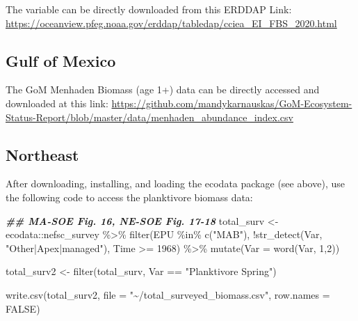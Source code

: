 \documentclass[
]{book}
\newenvironment{Shaded}{\begin{snugshade}}{\end{snugshade}}
\newcommand{\AttributeTok}[1]{\textcolor[rgb]{0.77,0.63,0.00}{#1}}
\newcommand{\ConstantTok}[1]{\textcolor[rgb]{0.00,0.00,0.00}{#1}}
\newcommand{\DecValTok}[1]{\textcolor[rgb]{0.00,0.00,0.81}{#1}}
\newcommand{\DocumentationTok}[1]{\textcolor[rgb]{0.56,0.35,0.01}{\textbf{\textit{#1}}}}
\newcommand{\FunctionTok}[1]{\textcolor[rgb]{0.00,0.00,0.00}{#1}}
\newcommand{\NormalTok}[1]{#1}
\newcommand{\OtherTok}[1]{\textcolor[rgb]{0.56,0.35,0.01}{#1}}
\newcommand{\SpecialCharTok}[1]{\textcolor[rgb]{0.00,0.00,0.00}{#1}}
\newcommand{\StringTok}[1]{\textcolor[rgb]{0.31,0.60,0.02}{#1}}
\begin{document}
The variable can be directly downloaded from this ERDDAP Link: \url{https://oceanview.pfeg.noaa.gov/erddap/tabledap/cciea_EI_FBS_2020.html}

\hypertarget{gulf-of-mexico-1}{%
\subsection{Gulf of Mexico}\label{gulf-of-mexico-1}}

The GoM Menhaden Biomass (age 1+) data can be directly accessed and downloaded at this link: \url{https://github.com/mandykarnauskas/GoM-Ecosystem-Status-Report/blob/master/data/menhaden_abundance_index.csv}

\hypertarget{northeast-1}{%
\subsection{Northeast}\label{northeast-1}}

After downloading, installing, and loading the ecodata package (see above), use the following code to access the planktivore biomass data:

\begin{Shaded}
\begin{Highlighting}[]
\DocumentationTok{\#\# MA{-}SOE Fig. 16, NE{-}SOE Fig. 17{-}18}
\NormalTok{total\_surv }\OtherTok{\textless{}{-}}\NormalTok{ ecodata}\SpecialCharTok{::}\NormalTok{nefsc\_survey }\SpecialCharTok{\%\textgreater{}\%}
  \FunctionTok{filter}\NormalTok{(EPU }\SpecialCharTok{\%in\%} \FunctionTok{c}\NormalTok{(}\StringTok{"MAB"}\NormalTok{),}
         \SpecialCharTok{!}\FunctionTok{str\_detect}\NormalTok{(Var, }\StringTok{"Other|Apex|managed"}\NormalTok{),}
\NormalTok{         Time }\SpecialCharTok{\textgreater{}=} \DecValTok{1968}\NormalTok{) }\SpecialCharTok{\%\textgreater{}\%}
  \FunctionTok{mutate}\NormalTok{(}\AttributeTok{Var =} \FunctionTok{word}\NormalTok{(Var, }\DecValTok{1}\NormalTok{,}\DecValTok{2}\NormalTok{))}

\NormalTok{total\_surv2 }\OtherTok{\textless{}{-}} \FunctionTok{filter}\NormalTok{(total\_surv, Var }\SpecialCharTok{==} \StringTok{"Planktivore Spring"}\NormalTok{)}

\FunctionTok{write.csv}\NormalTok{(total\_surv2, }\AttributeTok{file =} \StringTok{"\textasciitilde{}/total\_surveyed\_biomass.csv"}\NormalTok{, }\AttributeTok{row.names =} \ConstantTok{FALSE}\NormalTok{)}
\end{Highlighting}
\end{Shaded}
\end{document}
